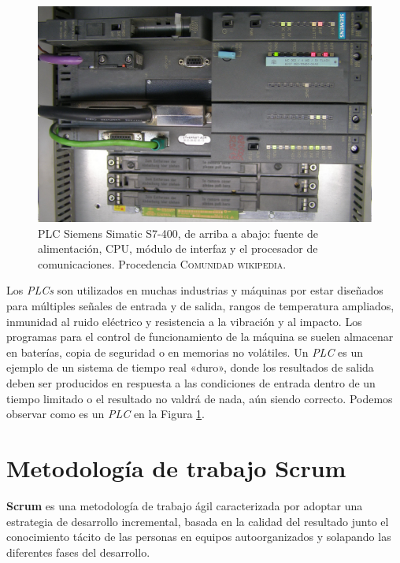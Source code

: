 \documentclass[pdftex,11pt,a4paper]{book}
\begin{document}
\begin{figure}[h]
\begin{center}
\includegraphics[width=\textwidth]{img/plc.jpg}
\caption{\label{plc_image}PLC Siemens Simatic S7-400, de arriba a abajo: fuente de alimentación, CPU, módulo de interfaz y el procesador de comunicaciones. Procedencia \textsc{Comunidad wikipedia}\cite{plc_wiki}.}
\end{center}
\end{figure}

Los \emph{PLCs} son utilizados en muchas industrias y máquinas por estar diseñados para múltiples señales de entrada y de salida, rangos de temperatura ampliados, inmunidad al ruido eléctrico y resistencia a la vibración y al impacto. Los programas para el control de funcionamiento de la máquina se suelen almacenar en baterías, copia de seguridad o en memorias no volátiles. Un \emph{PLC} es un ejemplo de un sistema de tiempo real «duro», donde los resultados de salida deben ser producidos en respuesta a las condiciones de entrada dentro de un tiempo limitado o el resultado no valdrá de nada, aún siendo correcto\cite{plc}. Podemos observar como es un \emph{PLC} en la Figura \ref{plc_image}.

\section{Metodología de trabajo Scrum}
\textbf{Scrum} \cite{scrum} es una metodología de trabajo ágil caracterizada por adoptar una estrategia de desarrollo incremental, basada en la calidad del resultado junto el conocimiento tácito de las personas en equipos autoorganizados y solapando las diferentes fases del desarrollo.
\end{document}
